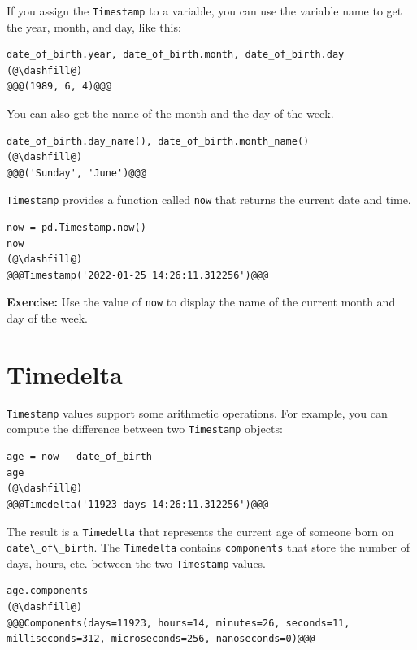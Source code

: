 If you assign the \passthrough{\lstinline!Timestamp!} to a variable, you
can use the variable name to get the year, month, and day, like this:

\begin{lstlisting}[]
date_of_birth.year, date_of_birth.month, date_of_birth.day
(@\dashfill@)
@@@(1989, 6, 4)@@@
\end{lstlisting}

You can also get the name of the month and the day of the week.

\begin{lstlisting}[]
date_of_birth.day_name(), date_of_birth.month_name()
(@\dashfill@)
@@@('Sunday', 'June')@@@
\end{lstlisting}

\passthrough{\lstinline!Timestamp!} provides a function called
\passthrough{\lstinline!now!} that returns the current date and time.

\begin{lstlisting}[]
now = pd.Timestamp.now()
now
(@\dashfill@)
@@@Timestamp('2022-01-25 14:26:11.312256')@@@
\end{lstlisting}

\textbf{Exercise:} Use the value of \passthrough{\lstinline!now!} to
display the name of the current month and day of the week.

\hypertarget{timedelta}{%
\section{Timedelta}\label{timedelta}}

\passthrough{\lstinline!Timestamp!} values support some arithmetic
operations. For example, you can compute the difference between two
\passthrough{\lstinline!Timestamp!} objects:

\begin{lstlisting}[]
age = now - date_of_birth
age
(@\dashfill@)
@@@Timedelta('11923 days 14:26:11.312256')@@@
\end{lstlisting}

The result is a \passthrough{\lstinline!Timedelta!} that represents the
current age of someone born on
\passthrough{\lstinline!date\_of\_birth!}. The
\passthrough{\lstinline!Timedelta!} contains
\passthrough{\lstinline!components!} that store the number of days,
hours, etc. between the two \passthrough{\lstinline!Timestamp!} values.

\begin{lstlisting}[]
age.components
(@\dashfill@)
@@@Components(days=11923, hours=14, minutes=26, seconds=11, milliseconds=312, microseconds=256, nanoseconds=0)@@@
\end{lstlisting}

